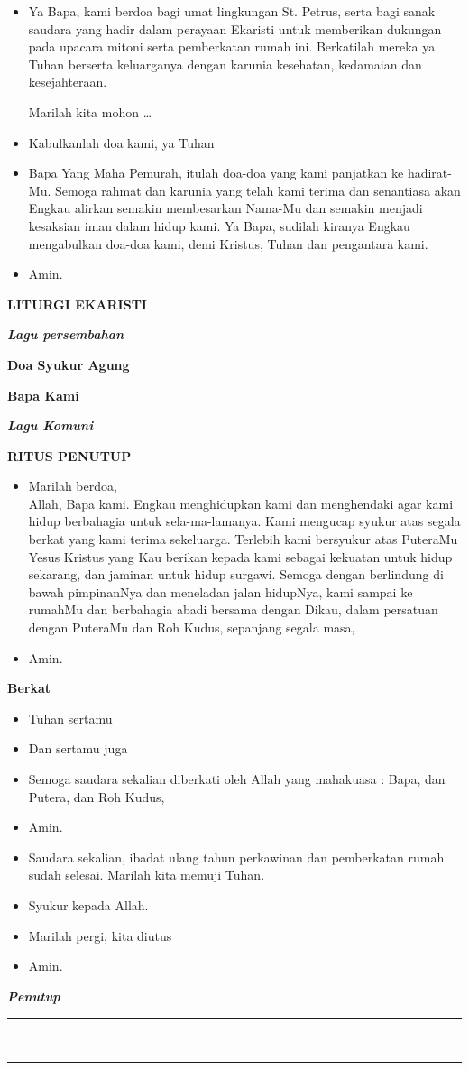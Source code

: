 \documentclass[12pt,twoside,anypage]{scrbook}
\makeatletter
\newcommand{\judul}[1]{%
  {\parindent \z@ \centering \normalfont
    \interlinepenalty\@M \large \bfseries #1\par\nobreak \vskip 20\p@ }}
\newcommand{\subjudul}[1]{%
  {\parindent \z@ \normalfont
    \interlinepenalty\@M \bfseries #1\par\nobreak \vskip 20\p@ }}
\newcommand{\lagu}[1]{%
  {\parindent \z@ \normalfont
    \interlinepenalty\@M \bfseries \emph{#1}\par\nobreak \vskip 20\p@ }}
\newcommand{\BU}[1]{\begin{itemize} \item[U:] #1 \end{itemize}}
\newcommand{\BI}[1]{\begin{itemize} \item[I:] #1 \end{itemize}}
\newcommand{\BP}[1]{\begin{itemize} \item[P:] #1 \end{itemize}}
\makeatother
\begin{document}
\BP{Ya Bapa, kami berdoa bagi umat lingkungan St. Petrus, serta bagi sanak saudara yang hadir dalam perayaan Ekaristi untuk memberikan dukungan pada upacara mitoni serta pemberkatan rumah ini. Berkatilah mereka ya Tuhan berserta keluarganya dengan karunia kesehatan, kedamaian dan kesejahteraan.

Marilah kita mohon \ldots}

\BU{Kabulkanlah doa kami, ya Tuhan}

\BI{Bapa Yang Maha Pemurah, itulah doa-doa yang kami panjatkan ke hadirat-Mu. Semoga rahmat dan karunia yang telah kami terima dan senantiasa akan Engkau alirkan semakin membesarkan Nama-Mu dan semakin menjadi kesaksian iman dalam hidup kami. Ya Bapa, sudilah kiranya Engkau mengabulkan doa-doa kami, demi Kristus, Tuhan dan pengantara kami.}

\BU{Amin.}

\judul{LITURGI EKARISTI}

\lagu{Lagu persembahan}


\subjudul{Doa Syukur Agung}

\subjudul{Bapa Kami}

\lagu{Lagu Komuni}

\judul{RITUS PENUTUP}

\BI{Marilah berdoa,\\
Allah, Bapa kami. Engkau menghidupkan kami dan menghendaki agar kami hidup berbahagia untuk {sela-ma}-{lamanya}. Kami mengucap syukur atas segala berkat yang kami terima sekeluarga. Terlebih kami bersyukur atas PuteraMu Yesus Kristus yang Kau berikan kepada kami sebagai kekuatan untuk hidup sekarang, dan jaminan untuk hidup surgawi. Semoga dengan berlindung di bawah pimpinanNya dan meneladan jalan hidupNya, kami sampai ke rumahMu dan berbahagia abadi bersama dengan Dikau, dalam persatuan dengan PuteraMu dan Roh Kudus, sepanjang segala masa,}
\BU{Amin.}

\subjudul{Berkat}

\BI{Tuhan sertamu}
\BU{Dan sertamu juga}
\BI{Semoga saudara sekalian diberkati oleh Allah yang mahakuasa :
\Cross {~}Bapa, dan Putera, dan Roh Kudus,}
\BU{Amin.}
\BI{Saudara sekalian, ibadat ulang tahun perkawinan dan pemberkatan rumah sudah selesai.
Marilah kita memuji Tuhan.}
\BU{Syukur kepada Allah.}
\BI{Marilah pergi, kita diutus}
\BU{Amin.}

\lagu{Penutup}



\hrule
{~}\\[-0.45cm]\hrule
\end{document}
